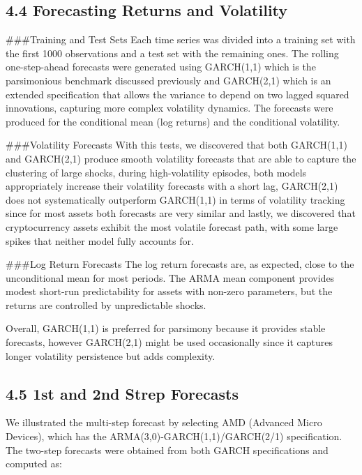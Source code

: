 \documentclass[
]{article}
\begin{document}
\subsection{4.4 Forecasting Returns and
Volatility}\label{forecasting-returns-and-volatility}

\#\#\#Training and Test Sets Each time series was divided into a
training set with the first 1000 observations and a test set with the
remaining ones. The rolling one-step-ahead forecasts were generated
using GARCH(1,1) which is the parsimonious benchmark discussed
previously and GARCH(2,1) which is an extended specification that allows
the variance to depend on two lagged squared innovations, capturing more
complex volatility dynamics. The forecasts were produced for the
conditional mean (log returns) and the conditional volatility.

\#\#\#Volatility Forecasts With this tests, we discovered that both
GARCH(1,1) and GARCH(2,1) produce smooth volatility forecasts that are
able to capture the clustering of large shocks, during high-volatility
episodes, both models appropriately increase their volatility forecasts
with a short lag, GARCH(2,1) does not systematically outperform
GARCH(1,1) in terms of volatility tracking since for most assets both
forecasts are very similar and lastly, we discovered that cryptocurrency
assets exhibit the most volatile forecast path, with some large spikes
that neither model fully accounts for.

\#\#\#Log Return Forecasts The log return forecasts are, as expected,
close to the unconditional mean for most periods. The ARMA mean
component provides modest short-run predictability for assets with
non-zero parameters, but the returns are controlled by unpredictable
shocks.

Overall, GARCH(1,1) is preferred for parsimony because it provides
stable forecasts, however GARCH(2,1) might be used occasionally since it
captures longer volatility persistence but adds complexity.

\subsection{4.5 1st and 2nd Strep
Forecasts}\label{st-and-2nd-strep-forecasts}

We illustrated the multi-step forecast by selecting AMD (Advanced Micro
Devices), which has the ARMA(3,0)-GARCH(1,1)/GARCH(2/1) specification.
The two-step forecasts were obtained from both GARCH specifications and
computed as:
\end{document}
